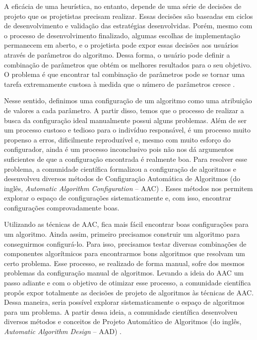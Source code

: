 A eficácia de uma heurística, no entanto, depende de uma série de decisões de projeto que os projetistas precisam realizar. Essas decisões são baseadas em ciclos de desenvolvimento e validação das estratégias desenvolvidas. Porém, mesmo com o processo de desenvolvimento finalizado, algumas escolhas de implementação permanecem em aberto, e o projetista pode expor essas decisões aos usuários através de parâmetros do algoritmo. Dessa forma, o usuário pode definir a combinação de parâmetros que obtém os melhores resultados para o seu objetivo. O problema é que encontrar tal combinação de parâmetros pode se tornar uma tarefa extremamente custosa à medida que o número de parâmetros cresce \citep{birattari2009tuning}.

Nesse sentido, definimos uma configuração de um algoritmo como uma atribuição de valores a cada parâmetro. A partir disso, temos que o processo de realizar a busca da configuração ideal manualmente possui alguns problemas. Além de ser um processo custoso e tedioso para o indivíduo responsável, é um processo muito propenso a erros, dificilmente reproduzível e, mesmo com muito esforço do configurador, ainda é um processo inconclusivo pois não nos dá argumentos suficientes de que a configuração encontrada é realmente boa. Para resolver esse problema, a comunidade científica formalizou a configuração de algoritmos e desenvolveu diversos métodos de Configuração Automática de Algoritmos (do inglês, \textit{Automatic Algorithm Configuration} -- \acs{AAC}) \citep{birattari2009tuning}. Esses métodos nos permitem explorar o espaço de configurações sistematicamente e, com isso, encontrar configurações comprovadamente boas.

Utilizando as técnicas de \ac{AAC}, fica mais fácil encontrar boas configurações para um algoritmo. Ainda assim, primeiro precisamos construir um algoritmo para conseguirmos configurá-lo. Para isso, precisamos testar diversas combinações de componentes algorítmicos para encontrarmos bons algoritmos que resolvam um certo problema. Esse processo, se realizado de forma manual, sofre dos mesmos problemas da configuração manual de algoritmos. Levando a ideia do \ac{AAC} um passo adiante e com o objetivo de otimizar esse processo, a comunidade científica propôs expor totalmente as decisões de projeto de algoritmos às técnicas de \ac{AAC}. Dessa maneira, seria possível explorar sistematicamente o espaço de algoritmos para um problema. A partir dessa ideia, a comunidade científica desenvolveu diversos métodos e conceitos de Projeto Automático de Algoritmos (do inglês, \textit{Automatic Algorithm Design} -- \acs{AAD}) \citep{stutzle2018automated}.

